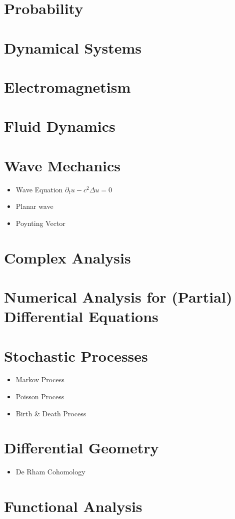 \documentclass[10pt]{article}
\begin{document}
\section{Probability}
\section{Dynamical Systems}
\section{Electromagnetism}
\section{Fluid Dynamics}
\section{Wave Mechanics}
	\begin{itemize}
	\item Wave Equation $\partial_t u-c^2\Delta u=0$
	\item Planar wave
	\item Poynting Vector
	\end{itemize}
\section{Complex Analysis}
\section{Numerical Analysis for (Partial) Differential Equations}
\section{Stochastic Processes}
\begin{itemize}
	\item Markov Process
	\item Poisson Process
	\item Birth \& Death Process
\end{itemize}
\section{Differential Geometry}
\begin{itemize}
	\item De Rham Cohomology
\end{itemize}
\section{Functional Analysis}
\end{document}

